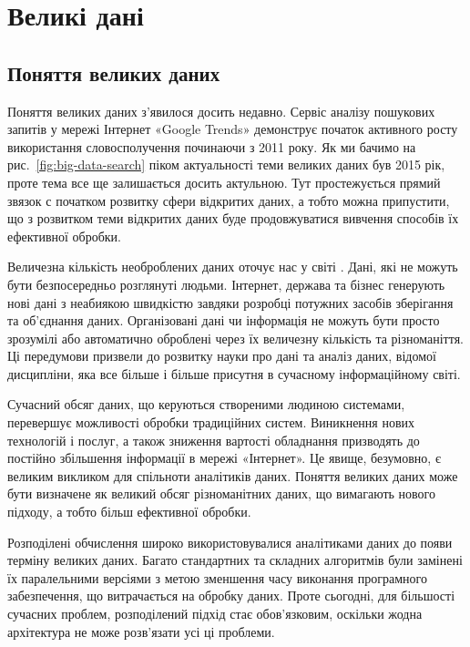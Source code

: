 \chapter{Великі дані}

\section{Поняття великих даних}

Поняття великих даних з'явилося досить недавно.
Сервіс аналізу пошукових запитів у мережі Інтернет «Google Trends» демонструє початок активного росту
використання словосполучення починаючи з 2011 року.
Як ми бачимо на рис.~\ref{fig:big-data-search} піком актуальності теми великих даних був 2015 рік, проте
тема все ще залишається досить актульною.
Тут простежується прямий звязок с початком розвитку сфери відкритих даних,
а тобто можна припустити, що з розвитком теми відкритих даних буде продовжуватися вивчення способів їх ефективної обробки.

Величезна кількість необроблених даних оточує нас у  світі \cite{BigDataFundamentals}.
Дані, які не можуть бути безпосередньо розглянуті людьми.
Інтернет, держава та бізнес генерують нові дані з неабиякою
швидкістю завдяки розробці потужних засобів зберігання та об'єднання
даних. Організовані дані чи інформація не можуть бути просто зрозумілі
або автоматично оброблені через їх величезну кількість та різноманіття.
Ці передумови призвели до розвитку науки про дані та
аналіз даних, відомої дисципліни, яка все більше і більше присутня в
сучасному інформаційному світі.

Сучасний обсяг даних, що керуються створеними людиною системами,
перевершує можливості обробки традиційних систем.
Виникнення нових технологій і послуг, а також зниження вартості обладнання призводять до постійно збільшення інформації в мережі «Інтернет».
Це явище, безумовно, є великим викликом для спільноти аналітиків даних.
Поняття великих даних може бути визначене як великий обсяг різноманітних даних, що вимагають нового підходу, а тобто більш ефективної обробки.

Розподілені обчислення широко використовувалися аналітиками даних до появи терміну великих даних.
Багато стандартних та складних алгоритмів були замінені їх паралельними версіями з метою зменшення
часу виконання програмного забезпечення, що витрачається на обробку даних.
Проте сьогодні, для більшості сучасних проблем, розподілений підхід стає обов'язковим, оскільки
жодна архітектура не може розв'язати усі ці проблеми.

